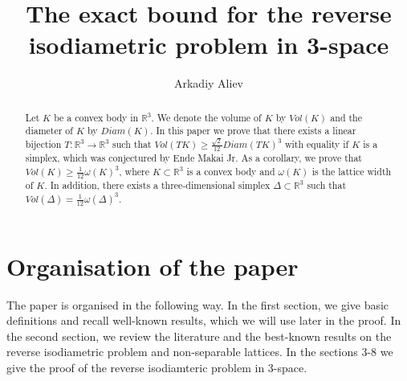 \documentclass[12pt]{article}
\begin{document}
\title{The exact bound for the reverse isodiametric problem in 3-space
}
\author{Arkadiy Aliev}
\date{}
\maketitle

    \begin{abstract}
        Let $K$ be a convex body in $\mathbb{R}^{3}$. We denote the volume of $K$ by $Vol(K)$ and the diameter of $K$ by $Diam(K).$  In this paper we prove that there exists a linear bijection $T:\mathbb{R}^{3}\to \mathbb{R}^{3}$ such that $Vol(TK)\geq \frac{\sqrt{2}}{12}Diam(TK)^3$ with equality if $K$ is a simplex, which was conjectured by Ende Makai Jr.      
        As a corollary, we prove that $Vol(K)\geq \frac{1}{12}\omega(K)^3$, where $K\subset \mathbb{R}^{3}$ is a convex body and  $\omega(K)$ is the lattice width of $K$. In addition, there exists a  three-dimensional simplex $\Delta\subset \mathbb{R}^3$ such that $Vol(\Delta) = \frac{1}{12}\omega(\Delta)^3.$
    \end{abstract}



\section*{Organisation of the paper}

        The paper is organised in the following way. In the first section, we give basic definitions and recall well-known results, which we will use later in the proof. In the second section, we review  the literature and the best-known results on the reverse isodiametric problem and non-separable lattices. In the sections 3-8 we give the proof of the reverse isodiamteric problem in 3-space.   
    \tableofcontents
\end{document}
